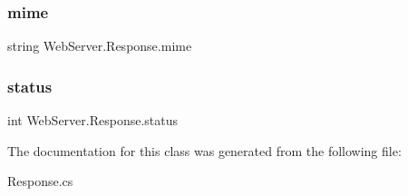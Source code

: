 \subsubsection{\texorpdfstring{mime}{mime}}
{\footnotesize\ttfamily string Web\+Server.\+Response.\+mime}





\mbox{\label{class_web_server_1_1_response_a132606b61e9c9d01b80114418920c0f7}} 
\subsubsection{\texorpdfstring{status}{status}}
{\footnotesize\ttfamily int Web\+Server.\+Response.\+status}







The documentation for this class was generated from the following file\+:\begin{DoxyCompactItemize}
\item 
Response.\+cs\end{DoxyCompactItemize}
